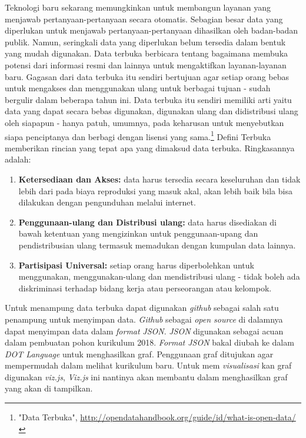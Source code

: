 Teknologi baru sekarang memungkinkan untuk membangun layanan yang menjawab pertanyaan-pertanyaan secara otomatis. Sebagian besar data yang diperlukan untuk menjawab pertanyaan-pertanyaan dihasilkan oleh badan-badan publik. Namun, seringkali data yang diperlukan belum tersedia dalam bentuk yang mudah digunakan. Data terbuka berbicara tentang bagaimana membuka potensi dari informasi resmi dan lainnya untuk mengaktifkan layanan-layanan baru. Gagasan dari data terbuka itu sendiri bertujuan agar setiap orang bebas untuk mengakses dan menggunakan ulang untuk berbagai tujuan - sudah bergulir dalam beberapa tahun ini. Data terbuka itu sendiri memiliki arti yaitu data yang dapat secara bebas digunakan, digunakan ulang dan didistribusi ulang oleh siapapun - hanya patuh, umumnya, pada keharusan untuk menyebutkan siapa penciptanya dan berbagi dengan lisensi yang sama.\footnote{"Data Terbuka", \url{http://opendatahandbook.org/guide/id/what-is-open-data/}} Defini Terbuka memberikan rincian yang tepat apa yang dimaksud data terbuka. Ringkasannya adalah:
\begin{enumerate}
\item \textbf{Ketersediaan dan Akses:} data harus tersedia secara keseluruhan dan tidak lebih dari pada biaya reproduksi yang masuk akal, akan lebih baik bila bisa dilakukan dengan pengunduhan melalui internet.
\item \textbf{Penggunaan-ulang dan Distribusi ulang:} data harus disediakan di bawah ketentuan yang mengizinkan untuk penggunaan-upang dan pendistribusian ulang termasuk memadukan dengan kumpulan data lainnya.
\item \textbf{Partisipasi Universal:} setiap orang harus diperbolehkan untuk menggunakan, menggunakan-ulang dan mendistribusi ulang - tidak boleh ada diskriminasi terhadap bidang kerja atau perseorangan atau kelompok.
\end{enumerate}

Untuk menampung data terbuka dapat digunakan \textit{github} sebagai salah satu penampung untuk menyimpan data. \textit{Github} sebagai \textit{open source} di dalamnya dapat menyimpan data dalam \textit{format} \textit{JSON}. \textit{JSON} digunakan sebagai acuan dalam pembuatan pohon kurikulum 2018. \textit{Format JSON} bakal diubah ke dalam \textit{DOT Language} untuk menghasilkan graf. Penggunaan graf ditujukan agar mempermudah dalam melihat kurikulum baru. Untuk mem \textit{visualisasi} kan graf digunakan \textit{viz.js}, \textit{Viz.js} ini nantinya akan membantu dalam menghasilkan graf yang akan di tampilkan.

